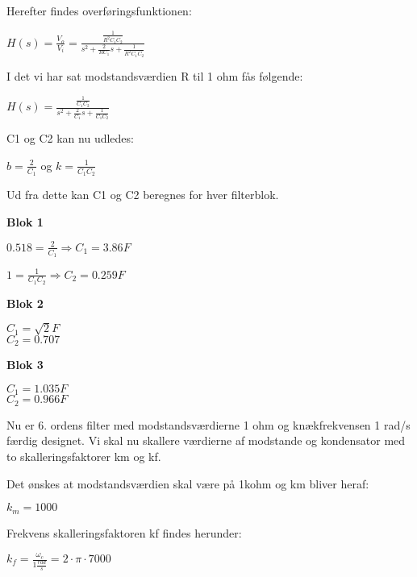 Herefter findes overføringsfunktionen: 
\begin{center}
$H(s)=\frac { { V }_{ o } }{ { V }_{ i } } =\frac { \frac { 1 }{ { R }^{ 2 }{ C }_{ 1 }{ C }_{ 2 } }  }{ { s }^{ 2 }+\frac { 2 }{ R{ C }_{ 1 } } s+\frac { 1 }{ { R }^{ 2 }{ C }_{ 1 }{ C }_{ 2 } }  }$ 
\end{center}

I det vi har sat modstandsværdien R til 1 ohm fås følgende:
\begin{center}
$H(s)=\frac { \frac { 1 }{ { C }_{ 1 }{ C }_{ 2 } }  }{ { s }^{ 2 }+\frac { 2 }{ { C }_{ 1 } } s+\frac { 1 }{ { C }_{ 1 }{ C }_{ 2 } }  }$
\end{center}

C1 og C2 kan nu udledes: 
\begin{center}
$b=\frac { 2 }{ { C }_{ 1 } }$ og  $k=\frac { 1 }{ { C }_{ 1 }{ C }_{ 2 } }$
\end{center}

Ud fra dette kan C1 og C2 beregnes for hver filterblok.

\textbf{Blok 1}

\begin{center}
$0.518=\frac { 2 }{ { C }_{ 1 } } \Rightarrow { C }_{ 1 }=3.86F$

$1=\frac { 1 }{ { C }_{ 1 }{ C }_{ 2 } } \Rightarrow { C }_{ 2 }=0.259F$
\end{center}

\textbf{Blok 2}
\begin{center}
${ C }_{ 1 }=\sqrt { 2 }F$ \\
${ C }_{ 2 }=0.707$ 
\end{center}
 
\textbf{Blok 3}
\begin{center}
${ C }_{ 1 }=1.035F$ \\
${ C }_{ 2 }=0.966F$  
\end{center}

Nu er 6. ordens filter med modstandsværdierne 1 ohm og knækfrekvensen 1 rad/s færdig designet. 
Vi skal nu skallere værdierne af modstande og kondensator med to skalleringsfaktorer km og kf.

Det ønskes at modstandsværdien skal være på 1kohm og km bliver heraf:
\begin{center}
${ k }_{ m }=1000$
\end{center}

Frekvens skalleringsfaktoren kf findes herunder:
\begin{center}
${ k }_{ f }=\frac { { \omega  }_{ c } }{ 1\frac { rad }{ s }  } =2\cdot \pi \cdot 7000$
\end{center}

